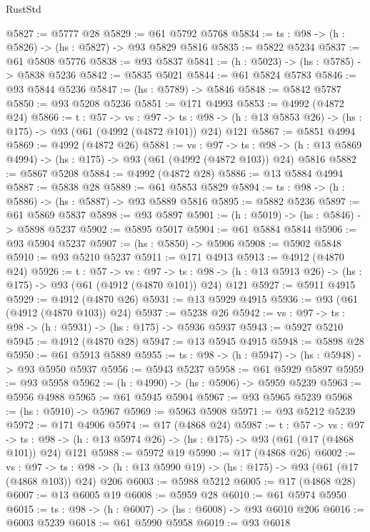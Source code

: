 \begin{lexlean}{RustStd}
\begin{coremodule}
@5827 := @5777 @28
@5829 := @61 @5792 @5768
@5834 := {ts : @98} -> (h : @5826) -> (hs : @5827) -> @93 @5829 @5816
@5835 := @5822 @5234
@5837 := @61 @5808 @5776
@5838 := @93 @5837
@5841 := (h : @5023) -> (hs : @5785) -> @5838 @5236
@5842 := @5835 @5021
@5844 := @61 @5824 @5783
@5846 := @93 @5844 @5236
@5847 := (hs : @5789) -> @5846
@5848 := @5842 @5787
@5850 := @93 @5208 @5236
@5851 := @171 @4993
@5853 := @4992 (@4872 @24)
@5866 := {t : @57} ->
  {vs : @97} ->
  {ts : @98} -> (h : @13 @5853 @26) -> (hs : @175) -> @93 (@61 (@4992 (@4872 @101)) @24) @121
@5867 := @5851 @4994
@5869 := @4992 (@4872 @26)
@5881 := {vs : @97} ->
  {ts : @98} -> (h : @13 @5869 @4994) -> (hs : @175) -> @93 (@61 (@4992 (@4872 @103)) @24) @5816
@5882 := @5867 @5208
@5884 := @4992 (@4872 @28)
@5886 := @13 @5884 @4994
@5887 := @5838 @28
@5889 := @61 @5853 @5829
@5894 := {ts : @98} -> (h : @5886) -> (hs : @5887) -> @93 @5889 @5816
@5895 := @5882 @5236
@5897 := @61 @5869 @5837
@5898 := @93 @5897
@5901 := (h : @5019) -> (hs : @5846) -> @5898 @5237
@5902 := @5895 @5017
@5904 := @61 @5884 @5844
@5906 := @93 @5904 @5237
@5907 := (hs : @5850) -> @5906
@5908 := @5902 @5848
@5910 := @93 @5210 @5237
@5911 := @171 @4913
@5913 := @4912 (@4870 @24)
@5926 := {t : @57} ->
  {vs : @97} ->
  {ts : @98} -> (h : @13 @5913 @26) -> (hs : @175) -> @93 (@61 (@4912 (@4870 @101)) @24) @121
@5927 := @5911 @4915
@5929 := @4912 (@4870 @26)
@5931 := @13 @5929 @4915
@5936 := @93 (@61 (@4912 (@4870 @103)) @24)
@5937 := @5238 @26
@5942 := {vs : @97} -> {ts : @98} -> (h : @5931) -> (hs : @175) -> @5936 @5937
@5943 := @5927 @5210
@5945 := @4912 (@4870 @28)
@5947 := @13 @5945 @4915
@5948 := @5898 @28
@5950 := @61 @5913 @5889
@5955 := {ts : @98} -> (h : @5947) -> (hs : @5948) -> @93 @5950 @5937
@5956 := @5943 @5237
@5958 := @61 @5929 @5897
@5959 := @93 @5958
@5962 := (h : @4990) -> (hs : @5906) -> @5959 @5239
@5963 := @5956 @4988
@5965 := @61 @5945 @5904
@5967 := @93 @5965 @5239
@5968 := (hs : @5910) -> @5967
@5969 := @5963 @5908
@5971 := @93 @5212 @5239
@5972 := @171 @4906
@5974 := @17 (@4868 @24)
@5987 := {t : @57} ->
  {vs : @97} ->
  {ts : @98} -> (h : @13 @5974 @26) -> (hs : @175) -> @93 (@61 (@17 (@4868 @101)) @24) @121
@5988 := @5972 @19
@5990 := @17 (@4868 @26)
@6002 := {vs : @97} ->
  {ts : @98} -> (h : @13 @5990 @19) -> (hs : @175) -> @93 (@61 (@17 (@4868 @103)) @24) @206
@6003 := @5988 @5212
@6005 := @17 (@4868 @28)
@6007 := @13 @6005 @19
@6008 := @5959 @28
@6010 := @61 @5974 @5950
@6015 := {ts : @98} -> (h : @6007) -> (hs : @6008) -> @93 @6010 @206
@6016 := @6003 @5239
@6018 := @61 @5990 @5958
@6019 := @93 @6018

\end{coremodule}
\end{lexlean}

